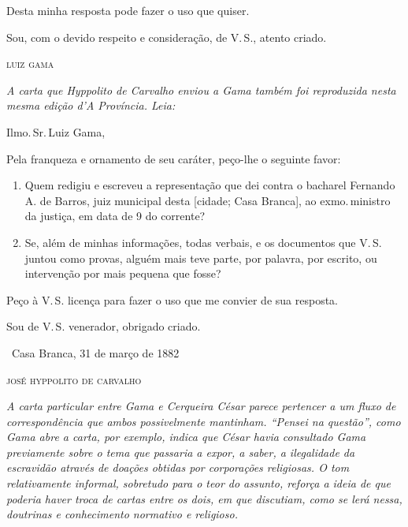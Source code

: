 Desta minha resposta pode fazer o uso que quiser.

Sou, com o devido respeito e consideração, de V.\,S., atento criado.\medskip

\hfill\textsc{luiz gama}

\pagebreak
\noindent\dotfill

\begin{resumo}\itshape 
A carta que Hyppolito de Carvalho enviou a Gama também foi reproduzida
  nesta mesma edição d'\emph{A Província}. Leia:
\end{resumo}

Ilmo.\,Sr.\,Luiz Gama,

Pela franqueza e ornamento de seu caráter, peço-lhe o seguinte favor:

\begin{enumerate}[label=\arabic*º:]
\item Quem redigiu e escreveu a representação que dei contra o bacharel
Fernando A. de Barros, juiz municipal desta {[}cidade; Casa Branca{]},
ao exmo.\,ministro da justiça, em data de 9 do corrente?

\item Se, além de minhas informações, todas verbais, e os documentos que
V.\,S. juntou como provas, alguém mais teve parte, por palavra, por
escrito, ou intervenção por mais pequena que fosse?
\end{enumerate}

Peço à V.\,S. licença para fazer o uso que me convier de sua resposta.

Sou de V.\,S. venerador, obrigado criado.\medskip

\hfill\ Casa Branca, 31 de março de 1882

\hfill\textsc{josé hyppolito de carvalho}


\begin{resumo}
\emph{A carta particular entre Gama e Cerqueira César parece pertencer a
um fluxo de correspondência que ambos possivelmente mantinham. ``Pensei
na questão'', como Gama abre a carta, por exemplo, indica que César havia
consultado Gama previamente sobre o tema que passaria a expor, a saber,
a ilegalidade da escravidão através de doações obtidas por corporações
religiosas. O tom relativamente informal, sobretudo para o teor do
assunto, reforça a ideia de que poderia haver troca de cartas entre os
dois, em que discutiam, como se lerá nessa, doutrinas e conhecimento
normativo e religioso. }
\end{resumo}

